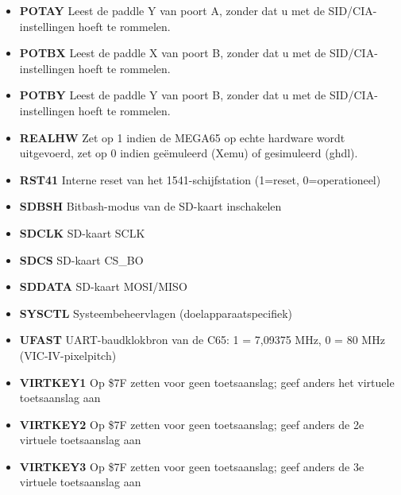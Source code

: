 \begin{itemize}
\item{\bf{POTAY}} Leest de paddle Y van poort A, zonder dat u met de SID/CIA-instellingen hoeft te rommelen.
\item{\bf{POTBX}} Leest de paddle X van poort B, zonder dat u met de SID/CIA-instellingen hoeft te rommelen.
\item{\bf{POTBY}} Leest de paddle Y van poort B, zonder dat u met de SID/CIA-instellingen hoeft te rommelen.
\item{\bf{REALHW}} Zet op 1 indien de MEGA65 op echte hardware wordt uitgevoerd, zet op 0 indien geëmuleerd (Xemu) of gesimuleerd (ghdl).
\item{\bf{RST41}} Interne reset van het 1541-schijfstation (1=reset, 0=operationeel)
\item{\bf{SDBSH}} Bitbash-modus van de SD-kaart inschakelen
\item{\bf{SDCLK}} SD-kaart SCLK
\item{\bf{SDCS}} SD-kaart CS\_BO
\item{\bf{SDDATA}} SD-kaart MOSI/MISO
\item{\bf{SYSCTL}} Systeembeheervlagen (doelapparaatspecifiek)
\item{\bf{UFAST}} UART-baudklokbron van de C65: 1 = 7,09375 MHz, 0 = 80 MHz (VIC-IV-pixelpitch)
\item{\bf{VIRTKEY1}} Op \$7F zetten voor geen toetsaanslag; geef anders het virtuele toetsaanslag aan
\item{\bf{VIRTKEY2}} Op \$7F zetten voor geen toetsaanslag; geef anders de 2e virtuele toetsaanslag aan
\item{\bf{VIRTKEY3}} Op \$7F zetten voor geen toetsaanslag; geef anders de 3e virtuele toetsaanslag aan
\end{itemize}
